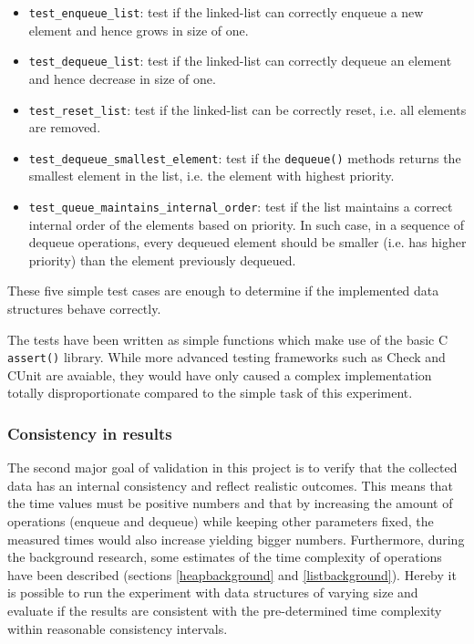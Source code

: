 \documentclass{article}
\begin{document}
\begin{itemize}
    \item \texttt{test\_enqueue\_list}: test if the linked-list can correctly enqueue a new element and hence grows in size of one.
    \item \texttt{test\_dequeue\_list}: test if the linked-list can correctly dequeue an element and hence decrease in size of one.
    \item \texttt{test\_reset\_list}: test if the linked-list can be correctly reset, i.e. all elements are removed.
    \item \texttt{test\_dequeue\_smallest\_element}: test if the \texttt{dequeue()} methods returns the smallest element in the list, i.e. the element with highest priority.
    \item \texttt{test\_queue\_maintains\_internal\_order}: test if the list maintains a correct internal order of the elements based on priority. In such case, in a sequence of dequeue operations, every dequeued element should be smaller (i.e. has higher priority) than the element previously dequeued.
\end{itemize}

These five simple test cases are enough to determine if the implemented data structures behave correctly.

The tests have been written as simple functions which make use of the basic C \texttt{assert()} library. While more advanced testing frameworks such as Check and CUnit are avaiable, they would have only caused a complex implementation totally disproportionate compared to the simple task of this experiment.

\subsubsection{Consistency in results}
The second major goal of validation in this project is to verify that the collected data has an internal consistency and reflect realistic outcomes. This means that the time values must be positive numbers and that by increasing the amount of operations (enqueue and dequeue) while keeping other parameters fixed, the measured times would also increase yielding bigger numbers.
Furthermore, during the background research, some estimates of the time complexity of operations have been described (sections \ref{heapbackground} and \ref{listbackground}). Hereby it is possible to run the experiment with data structures of varying size and evaluate if the results are consistent with the pre-determined time complexity within reasonable consistency intervals. 
\end{document}
